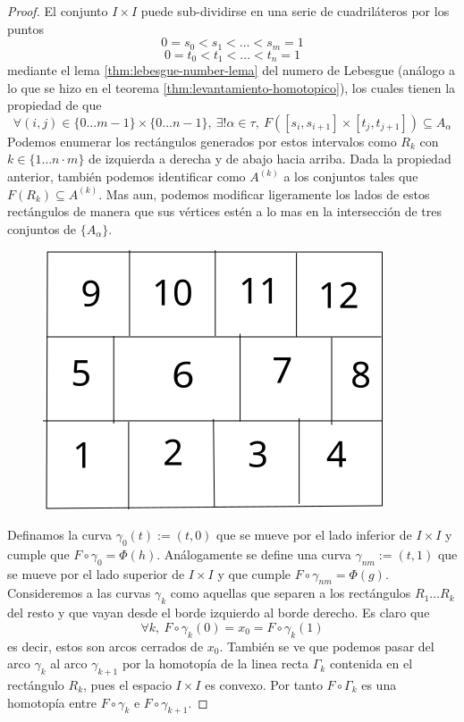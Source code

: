 \begin{proof}
  El conjunto \(I \times I\) puede sub-dividirse en una serie de
  cuadriláteros por los puntos
  \[ 0 = s_0 < s_1 < ... < s_m = 1 \]
  \[ 0 = t_0 < t_1 < ... < t_n = 1 \]
  mediante el lema \ref{thm:lebesgue-number-lema} del numero de Lebesgue
  (análogo a lo que se hizo en el teorema
  \ref{thm:levantamiento-homotopico}), los cuales tienen la propiedad de
  que
  \[ \forall (i,j) \in \{0 \dotsc m-1 \} \times \{0 \dotsc n - 1\},
    \ \exists ! \alpha \in \tau,\ F \left( [s_i, s_{i+1}] \times [t_j,
    t_{j+1}] \right) \subseteq A_\alpha \]
  Podemos enumerar los rectángulos generados por estos intervalos como
  \(R_k\) con \(k \in \{1 \dotsc n\cdot m\}\) de izquierda a derecha y
  de abajo hacia arriba. Dada la propiedad anterior, también podemos
  identificar como \( A^{(k)}\) a los conjuntos tales que \(F \left( R_k
  \right) \subseteq A^{(k)} \). Mas aun, podemos modificar ligeramente los
  lados de estos rectángulos de manera que sus vértices estén a lo mas en
  la intersección de tres conjuntos de \(\{A_\alpha\}\).
  \begin{figure}[h]
    \centering \includegraphics[scale=0.5]{./imagenes/grilla.png}
  \end{figure}

  Definamos la curva \(\gamma_0 (t) := (t, 0)\) que se mueve por el lado
  inferior de \(I \times I\) y cumple que \(F \circ \gamma_0 = \Phi (h)
  \). Análogamente se define una curva \(\gamma_{nm} := (t,1)\) que se
  mueve por el lado superior de \(I \times I\) y que cumple \(F \circ
  \gamma_{nm} = \Phi (g)\). Consideremos a las curvas \(\gamma_k\) como
  aquellas que separen a los rectángulos \(R_1 \dots R_k\) del resto y que
  vayan desde el borde izquierdo al borde derecho. Es claro que
  \[ \forall k,\ F \circ \gamma_k (0) = x_0 = F \circ \gamma_k (1) \]
  es decir, estos son arcos cerrados de \(x_0\). También se ve que
  podemos pasar del arco \(\gamma_k\) al arco \(\gamma_{k+1}\) por la
  homotopía de la linea recta \(\Gamma_k\) contenida en el rectángulo
  \(R_k\), pues el espacio \(I \times I\) es convexo. Por tanto \(F \circ
  \Gamma_k\) es una homotopía entre \(F \circ \gamma_k\) e \(F \circ
  \gamma_{k+1}\).


\end{proof}

